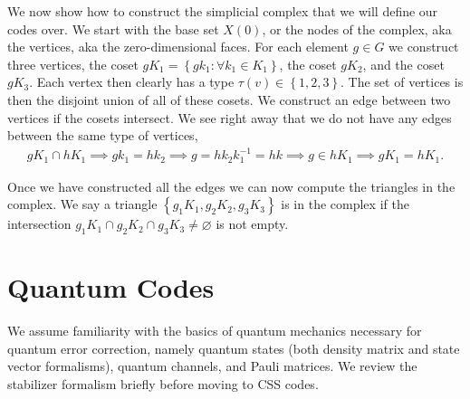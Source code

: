 \documentclass{article}
\newcommand{\set}[1]{\left\{ #1 \right\}}
\begin{document}
We now show how to construct the simplicial complex that we will define our codes over. We start with the base set $X(0)$, or the nodes of the complex, aka the vertices, aka the zero-dimensional faces. For each element $g \in G$ we construct three vertices, the coset $g K_1 = \set {g k_1 : \forall k_1 \in K_1}$, the coset $g K_2$, and the coset $g K_3$. Each vertex then clearly has a type $\tau(v) \in \set{1, 2, 3}$. The set of vertices is then the disjoint union of all of these cosets. We construct an edge between two vertices if the cosets intersect. We see right away that we do not have any edges between the same type of vertices,
\begin{align}
    g K_1 \cap h K_1 \implies g k_1 = h k_2 \implies g = h k_2 k_1^{-1} = h k \implies g \in h K_1 \implies g K_1 = h K_1.
\end{align}

Once we have constructed all the edges we can now compute the triangles in the complex. We say a triangle $\set{g_1 K_1, g_2 K_2, g_3 K_3}$ is in the complex if the intersection $g_1 K_1 \cap g_2 K_2 \cap g_3 K_3 \neq \varnothing$ is not empty. 


\section{Quantum Codes}
We assume familiarity with the basics of quantum mechanics necessary for quantum error correction, namely quantum states (both density matrix and state vector formalisms), quantum channels, and Pauli matrices. We review the stabilizer formalism briefly before moving to CSS codes.
\end{document}
